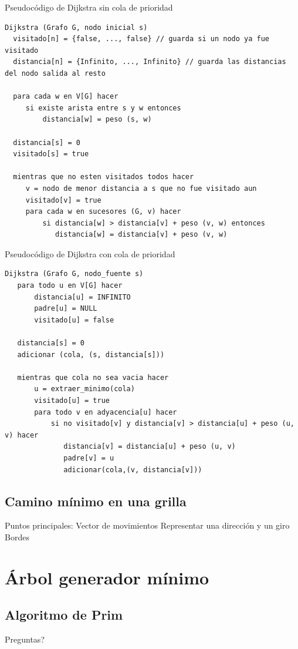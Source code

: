 \documentclass[compress]{beamer}
\begin{document}
\begin{frame}[fragile]{Pseudocódigo de Dijkstra sin cola de prioridad}
\begin{lstlisting}
Dijkstra (Grafo G, nodo inicial s)
  visitado[n] = {false, ..., false} // guarda si un nodo ya fue visitado
  distancia[n] = {Infinito, ..., Infinito} // guarda las distancias del nodo salida al resto
  
  para cada w en V[G] hacer
     si existe arista entre s y w entonces
         distancia[w] = peso (s, w)

  distancia[s] = 0
  visitado[s] = true
  
  mientras que no esten visitados todos hacer 
     v = nodo de menor distancia a s que no fue visitado aun
     visitado[v] = true
     para cada w en sucesores (G, v) hacer
         si distancia[w] > distancia[v] + peso (v, w) entonces
            distancia[w] = distancia[v] + peso (v, w)

\end{lstlisting}
\end{frame}

\begin{frame}[fragile]{Pseudocódigo de Dijkstra con cola de prioridad}
\begin{lstlisting}
Dijkstra (Grafo G, nodo_fuente s)       
   para todo u en V[G] hacer
       distancia[u] = INFINITO
       padre[u] = NULL
       visitado[u] = false
       
   distancia[s] = 0
   adicionar (cola, (s, distancia[s]))
   
   mientras que cola no sea vacia hacer
       u = extraer_minimo(cola)
       visitado[u] = true
       para todo v en adyacencia[u] hacer
           si no visitado[v] y distancia[v] > distancia[u] + peso (u, v) hacer
              distancia[v] = distancia[u] + peso (u, v)
              padre[v] = u
              adicionar(cola,(v, distancia[v]))
\end{lstlisting}
\end{frame}

\subsection{Camino mínimo en una grilla}
\begin{frame}
Puntos principales:
Vector de movimientos
Representar una dirección y un giro
Bordes

\end{frame}

\section{Árbol generador mínimo}
\subsection{Algoritmo de Prim}
\begin{frame}

\end{frame}

\begin{frame}
\begin{center}
{\Huge \textquestiondown Preguntas?}
\end{center}
\end{frame}
\end{document}
